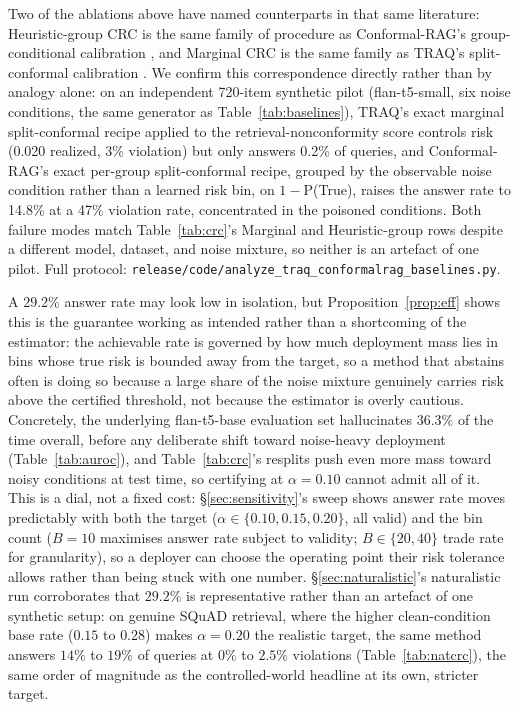 \documentclass[sn-basic]{sn-jnl}
\theoremstyle{thmstyleone}
\theoremstyle{thmstyletwo}
\begin{document}
Two of the ablations above have named counterparts in that same
literature: Heuristic-group CRC is the same family of procedure as
Conformal-RAG's group-conditional calibration \citep{feng2025conformalrag},
and Marginal CRC is the same family as TRAQ's split-conformal calibration
\citep{li2024traq}. We confirm this correspondence directly rather than by
analogy alone: on an independent 720-item synthetic pilot (flan-t5-small,
six noise conditions, the same generator as Table~\ref{tab:baselines}),
TRAQ's exact marginal split-conformal recipe applied to the
retrieval-nonconformity score controls risk (0.020 realized, 3\% violation)
but only answers 0.2\% of queries, and Conformal-RAG's exact per-group
split-conformal recipe, grouped by the observable noise condition rather
than a learned risk bin, on $1-$P(True), raises the answer rate to 14.8\%
at a 47\% violation rate, concentrated in the poisoned conditions. Both
failure modes match Table~\ref{tab:crc}'s Marginal and Heuristic-group rows
despite a different model, dataset, and noise mixture, so neither is an
artefact of one pilot. Full protocol:
\texttt{release/code/analyze\_traq\_conformalrag\_baselines.py}.

A $29.2\%$ answer rate may look low in isolation, but
Proposition~\ref{prop:eff} shows this is the guarantee working as
intended rather than a shortcoming of the estimator: the achievable
rate is governed by how much deployment mass lies in bins whose true
risk is bounded away from the target, so a method that abstains often
is doing so because a large share of the noise mixture genuinely
carries risk above the certified threshold, not because the estimator
is overly cautious. Concretely, the underlying flan-t5-base evaluation
set hallucinates $36.3\%$ of the time overall, before any deliberate
shift toward noise-heavy deployment (Table~\ref{tab:auroc}), and
Table~\ref{tab:crc}'s resplits push even more mass toward noisy
conditions at test time, so certifying at $\alpha = 0.10$ cannot admit
all of it. This is a dial, not a fixed cost:
\S\ref{sec:sensitivity}'s sweep shows answer rate moves predictably
with both the target ($\alpha \in \{0.10, 0.15, 0.20\}$, all valid)
and the bin count ($B = 10$ maximises answer rate subject to
validity; $B \in \{20, 40\}$ trade rate for granularity), so a
deployer can choose the operating point their risk tolerance allows
rather than being stuck with one number.
\S\ref{sec:naturalistic}'s naturalistic run corroborates that $29.2\%$
is representative rather than an artefact of one synthetic setup: on
genuine SQuAD retrieval, where the higher clean-condition base rate
($0.15$ to $0.28$) makes $\alpha = 0.20$ the realistic target, the
same method answers $14\%$ to $19\%$ of queries at $0\%$ to $2.5\%$
violations (Table~\ref{tab:natcrc}), the same order of magnitude as
the controlled-world headline at its own, stricter target.
\end{document}
